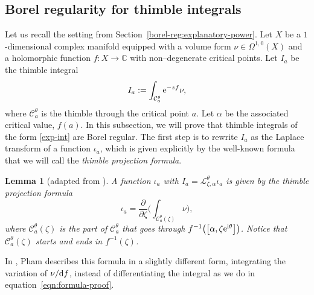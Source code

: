 \documentclass[10pt,a4paper]{amsart}
\newcommand{\maps}{\colon}
\newcommand{\C}{\mathbb{C}}
\newcommand{\laplace}{\mathcal{L}}
\numberwithin{equation}{section}
\newtheorem{Lemma}[Theorem]{Lemma}
\begin{document}
\subsection{Borel regularity for thimble integrals}\label{borel-reg-thimble}
Let us recall the setting from Section~\ref{borel-reg:explanatory-power}. Let $X$ be a $1$-dimensional complex manifold equipped with a volume form $\nu \in \Omega^{1,0}(X)$ and a holomorphic function $f\maps X\to\C$ with non--degenerate critical points. Let $I_a$ be the thimble integral
\begin{equation}\label{exp-int}
I_a := \int_{\mathcal{C}_a^\theta} {\rm e}^{-zf} \nu,
\end{equation}
where $\mathcal{C}_a^\theta$ is the thimble through the critical point $a$. Let $\alpha$ be the associated critical value, $f(a)$. In this subsection, we will prove that thimble integrals of the form \eqref{exp-int} are Borel regular. The first step is to rewrite $I_a$ as the Laplace transform of a function $\iota_a$, which is given explicitly by the well-known formula that we will call the \textit{thimble projection formula}.
%
\begin{Lemma}[adapted from {\cite[Section~3.3]{pham}}]\label{lem:thimble_proj_formula-proof}
A function $\iota_a$ with $I_a = \laplace_{\zeta, \alpha}^\theta \iota_a$ is given by the {\em thimble projection formula}
\begin{equation}\label{eqn:formula-proof}
\iota_a = \frac{\partial}{\partial \zeta} \bigg( \int_{\mathcal{C}_a^\theta(\zeta)}\nu \bigg),
\end{equation}
where $\mathcal{C}_a^\theta(\zeta)$ is the part of $\mathcal{C}_a^\theta$ that goes through $f^{-1}\bigl(\bigl[\alpha,\zeta {\rm e}^{{\rm i}\theta}\bigr]\bigr)$. Notice that $\mathcal{C}_a^\theta(\zeta)$ starts and ends in $f^{-1}(\zeta)$.
\end{Lemma}
\begin{Remark}
In \cite{pham}, Pham describes this formula in a slightly different form, integrating the variation of $\nu/{\rm d}f$, instead of differentiating the integral as we do in equation~\eqref{eqn:formula-proof}.
\end{Remark}
\end{document}
